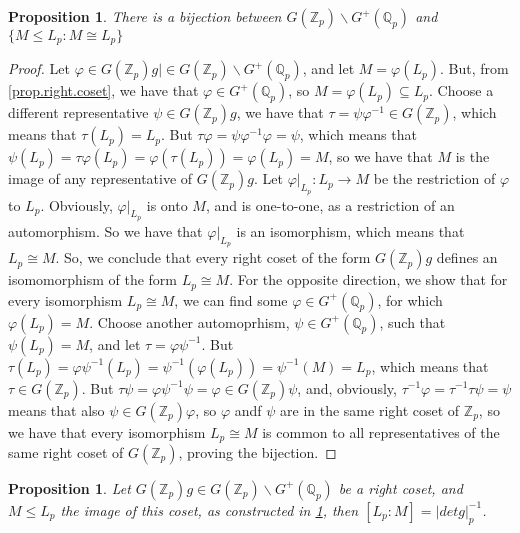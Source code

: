 \documentclass[12pt]{article}
\newtheorem{proposition}[theorem]{Proposition}
\begin{document}
\begin{proposition}
\label{prop.prop.coset.bijection}
There is a bijection between $G(\mathbb{Z}_p)\backslash G^+(\mathbb{Q}_p)$ and $\{M\leq L_p : M\cong L_p\}$
\end{proposition}
\begin{proof}
Let $\varphi\in G(\mathbb{Z}_p)g|\in G(\mathbb{Z}_p)\backslash G^+(\mathbb{Q}_p)$, and let $M=\varphi(L_p)$. But, from \ref{prop.right.coset}, we have that $\varphi\in G^+(\mathbb{Q}_p)$, so $M=\varphi(L_p)\subseteq L_p$. Choose a different representative $\psi\in G(\mathbb{Z}_p)g$, we have that $\tau=\psi\varphi^{-1}\in G(\mathbb{Z}_p)$, which means that $\tau(L_p)=L_p$. But $\tau\varphi=\psi\varphi^{-1}\varphi=\psi$, which means that $\psi(L_p)=\tau\varphi(L_p)=\varphi(\tau(L_p))=\varphi(L_p)=M$, so we have that $M$ is the image of any representative of $G(\mathbb{Z}_p)g$. Let $\varphi|_{L_p}:L_p\rightarrow M$ be the restriction of $\varphi$ to $L_p$. Obviously, $\varphi|_{L_p}$ is onto $M$, and is one-to-one, as a restriction of an automorphism. So we have that $\varphi|_{L_p}$ is an isomorphism, which means that $L_p\cong M$. So, we conclude that every right coset of the form $G(\mathbb{Z}_p)g$ defines an isomomorphism of the form $L_p\cong M$. For the opposite direction, we show that for every isomorphism $L_p\cong M$, we can find some $\varphi\in G^{+}(\mathbb{Q}_p)$, for which $\varphi(L_p)=M$. Choose another automoprhism, $\psi\in G^{+}(\mathbb{Q}_p)$, such that $\psi(L_p)=M$, and let $\tau=\varphi\psi^{-1}$. But $\tau(L_p)=\varphi\psi^{-1}(L_p)=\psi^{-1}(\varphi(L_p))=\psi^{-1}(M)=L_p$, which means that $\tau\in G(\mathbb{Z}_p)$. But $\tau\psi=\varphi\psi^{-1}\psi=\varphi\in G(\mathbb{Z}_p)\psi$, and, obviously, $\tau^{-1}\varphi=\tau^{-1}\tau\psi=\psi$ means that also $\psi\in G(\mathbb{Z}_p)\varphi$, so $\varphi$ andf $\psi$ are in the same right coset of $\mathbb{Z}_p$, so we have that every isomorphism $L_p\cong M$ is common to all representatives of the same right coset of $G(\mathbb{Z}_p)$, proving the bijection.
\end{proof}
\begin{proposition}
\label{prop.index.submodule}
Let $G(\mathbb{Z}_p)g\in G(\mathbb{Z}_p)\backslash G^+(\mathbb{Q}_p)$ be a right coset, and $M\leq L_p$ the image of this coset, as constructed in \ref{prop.prop.coset.bijection}, then $[L_p:M]=|det g|_p^{-1}$.
\end{proposition}
\end{document}

